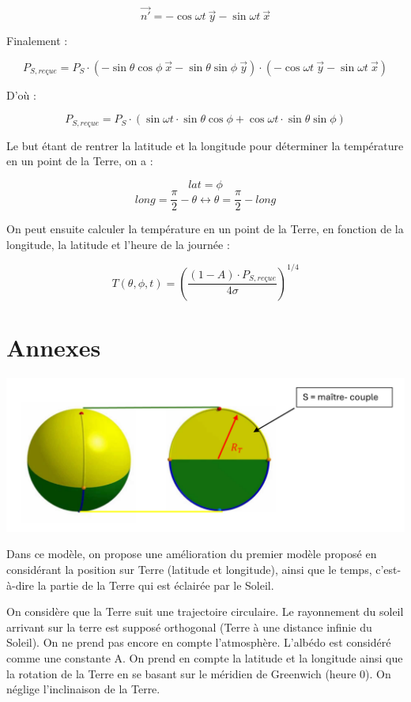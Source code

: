 \documentclass[a4paper,11pt]{article}
\begin{document}
\[ \vec{n'} = - \cos \omega t ~ \vec{y} - \sin \omega t ~ \vec{x} \]

Finalement :

\[ P_{S,reçue} = P_S \cdot (- \sin \theta \cos \phi ~ \vec{x} - \sin \theta \sin \phi ~ \vec{y}) \cdot (- \cos \omega t ~ \vec{y} - \sin \omega t ~ \vec{x}) \]

D'où :

\[ P_{S,reçue} = P_S \cdot (\sin \omega t \cdot \sin \theta \cos \phi + \cos \omega t \cdot \sin \theta \sin \phi) \]

Le but étant de rentrer la latitude et la longitude pour déterminer la température en un point de la Terre, on a :

\[ lat = \phi \]
\[ long = \dfrac{\pi}{2} - \theta \leftrightarrow \theta = \dfrac{\pi}{2} - long \]

On peut ensuite calculer la température en un point de la Terre, en fonction de la longitude, la latitude et l'heure de la journée :

\[ T (\theta , \phi , t) = \left(\dfrac{(1 - A) \cdot P_{S,reçue}}{4\sigma}\right)^{1/4} \]

\section{Annexes}

\begin{adjustbox}{center}
\includegraphics[scale=0.9]{Schema_maitre_couple}
\end{adjustbox}

Dans ce modèle, on propose une amélioration du premier modèle proposé en considérant la position sur Terre (latitude et longitude), ainsi que le temps, c'est-à-dire la partie de la Terre qui est éclairée par le Soleil.

On considère que la Terre suit une trajectoire circulaire. Le rayonnement du soleil arrivant sur la terre est supposé orthogonal (Terre à une distance infinie du Soleil). On ne prend pas encore en compte l'atmosphère. L'albédo est considéré comme une constante A. On prend en compte la latitude et la longitude ainsi que la rotation de la Terre en se basant sur le méridien de Greenwich (heure 0). On néglige l'inclinaison de la Terre.
\end{document}
